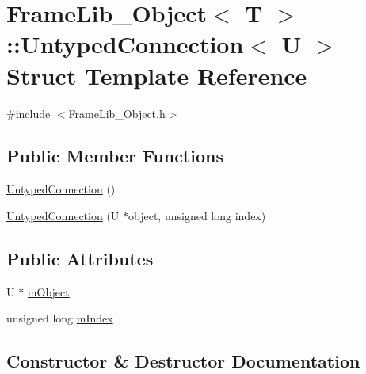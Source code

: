 \hypertarget{struct_frame_lib___object_1_1_untyped_connection}{}\section{Frame\+Lib\+\_\+\+Object$<$ T $>$\+:\+:Untyped\+Connection$<$ U $>$ Struct Template Reference}
\label{struct_frame_lib___object_1_1_untyped_connection}


{\ttfamily \#include $<$Frame\+Lib\+\_\+\+Object.\+h$>$}

\subsection*{Public Member Functions}
\begin{DoxyCompactItemize}
\item 
\hyperlink{struct_frame_lib___object_1_1_untyped_connection_ab0706f58f5ab054f8f13cf4bfd2b861b}{Untyped\+Connection} ()
\item 
\hyperlink{struct_frame_lib___object_1_1_untyped_connection_a3285c1e1381b29dd07d4213611a857f5}{Untyped\+Connection} (U $\ast$object, unsigned long index)
\end{DoxyCompactItemize}
\subsection*{Public Attributes}
\begin{DoxyCompactItemize}
\item 
U $\ast$ \hyperlink{struct_frame_lib___object_1_1_untyped_connection_ad7e6dbcc1873cedfe4a2a0a87cd1bffc}{m\+Object}
\item 
unsigned long \hyperlink{struct_frame_lib___object_1_1_untyped_connection_aec4b0807a42ae5bb1c936861dea4d02e}{m\+Index}
\end{DoxyCompactItemize}


\subsection{Constructor \& Destructor Documentation}
\mbox{\label{struct_frame_lib___object_1_1_untyped_connection_ab0706f58f5ab054f8f13cf4bfd2b861b}} 
